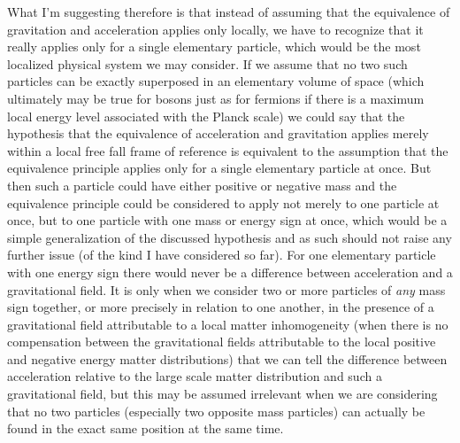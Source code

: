 \documentclass[notitlepage,12pt]{report}
\begin{document}
What I'm suggesting therefore is that instead of assuming that the equivalence of gravitation and acceleration applies only locally, we have to recognize that it really applies only for a single elementary particle, which would be the most localized physical system we may consider. If we assume that no two such particles can be exactly superposed in an elementary volume of space (which ultimately may be true for bosons just as for fermions if there is a maximum local energy level associated with the Planck scale) we could say that the hypothesis that the equivalence of acceleration and gravitation applies merely within a local free fall frame of reference is equivalent to the assumption that the equivalence principle applies only for a single elementary particle at once. But then such a particle could have either positive or negative mass and the equivalence principle could be considered to apply not merely to one particle at once, but to one particle with one mass or energy sign at once, which would be a simple generalization of the discussed hypothesis and as such should not raise any further issue (of the kind I have considered so far). For one elementary particle with one energy sign there would never be a difference between acceleration and a gravitational field. It is only when we consider two or more particles of \textit{any} mass sign together, or more precisely in relation to one another, in the presence of a gravitational field attributable to a local matter inhomogeneity (when there is no compensation between the gravitational fields attributable to the local positive and negative energy matter distributions) that we can tell the difference between acceleration relative to the large scale matter distribution and such a gravitational field, but this may be assumed irrelevant when we are considering that no two particles (especially two opposite mass particles) can actually be found in the exact same position at the same time.
\end{document}
